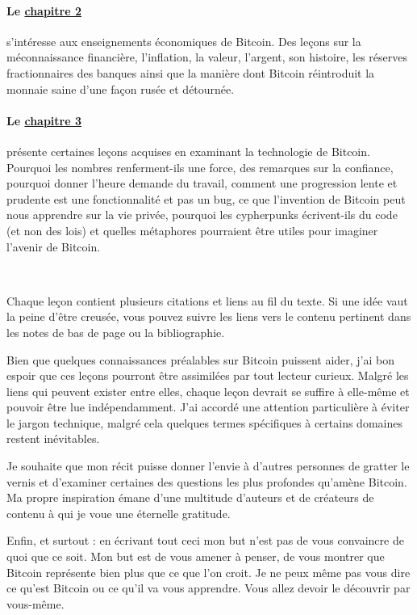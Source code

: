 \paragraph{Le \hyperref[ch:economics]{chapitre 2}}{s'intéresse aux enseignements
économiques de Bitcoin. Des leçons sur la méconnaissance financière,
l'inflation, la valeur, l'argent, son histoire, les réserves fractionnaires
des banques ainsi que la manière dont Bitcoin réintroduit la monnaie saine d'une
façon rusée et détournée.}

\paragraph{Le \hyperref[ch:technology]{chapitre 3}}{présente certaines leçons
acquises en examinant la technologie de Bitcoin. Pourquoi les nombres
renferment-ils une force, des remarques sur la confiance, pourquoi donner
l'heure demande du travail, comment une progression lente et prudente est une
fonctionnalité et pas un bug, ce que l'invention de Bitcoin peut nous apprendre
sur la vie privée, pourquoi les cypherpunks écrivent-ils du code (et non des
lois) et quelles métaphores pourraient être utiles pour imaginer l'avenir de
Bitcoin.}

~

Chaque leçon contient plusieurs citations et liens au fil du texte. Si une idée
vaut la peine d'être creusée, vous pouvez suivre les liens vers le contenu
pertinent dans les notes de bas de page ou la bibliographie.

Bien que quelques connaissances préalables sur Bitcoin puissent aider, j'ai bon
espoir que ces leçons pourront être assimilées par tout lecteur curieux. Malgré
les liens qui peuvent exister entre elles, chaque leçon devrait se suffire à
elle-même et pouvoir être lue indépendamment. J'ai accordé une attention
particulière à éviter le jargon technique, malgré cela quelques termes
spécifiques à certains domaines restent inévitables.

Je souhaite que mon récit puisse donner l'envie à d'autres personnes de gratter
le vernis et d'examiner certaines des questions les plus profondes qu'amène
Bitcoin. Ma propre inspiration émane d'une multitude d'auteurs et de créateurs
de contenu à qui je voue une éternelle gratitude.

Enfin, et surtout : en écrivant tout ceci mon but n'est pas de vous convaincre
de quoi que ce soit. Mon but est de vous amener à penser, de vous montrer que
Bitcoin représente bien plus que ce que l'on croit. Je ne peux même pas vous
dire ce qu'est Bitcoin ou ce qu'il va vous apprendre. Vous allez devoir le
découvrir par vous-même.

